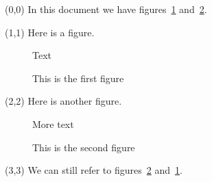 \documentclass{article}
\begin{document}
\begin{textblock}{5}(0,0)
In this document we have figures~\ref{figa} and~\ref{figb}.
\end{textblock}

\begin{textblock}{5}(1,1)
  Here is a figure.
  \begin{figure}
  Text
  \caption{This is the first figure}
  \label{figa}
  \end{figure}
\end{textblock}

\begin{textblock}{5}(2,2)
  Here is another figure.
  \begin{figure}
  More text
  \caption{\label{figb}This is the second figure}
  \end{figure}
\end{textblock}

\begin{textblock}{5}(3,3)
  We can still refer to figures~\ref{figb} and~\ref{figa}.
\end{textblock}
\end{document}
